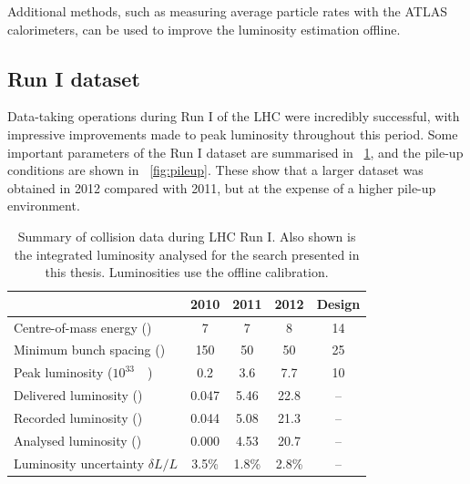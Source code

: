 Additional methods, such as measuring average particle rates with the ATLAS calorimeters, 
can be used to improve the luminosity estimation offline.



\subsection{Run I dataset}
\label{sec:dataset:dataset}

Data-taking operations during Run I of the LHC were incredibly successful, with impressive 
improvements made to peak luminosity throughout this period. Some important parameters of 
the Run I dataset are summarised in \Table~\ref{tab:dataset}, and the pile-up conditions are shown in \Figure~\ref{fig:pileup}. These show that a larger dataset was obtained in 2012 compared with 2011, but at the expense of a higher pile-up environment.

\begin{table}[h]
	\begin{tabular}{l@{\hskip 0.3in}c@{\hskip 0.3in}c@{\hskip 0.3in}c@{\hskip 0.3in}c}
	& 2010 & 2011 & 2012 & Design \\
	\hline
	Centre-of-mass energy (\TeV)         & 7 & 7 & 8 & 14 \\
	Minimum bunch spacing (\nano\second) & 150 & 50 & 50 & 25 \\
	Peak luminosity (\unit{$10^{33}$}{\lumiunits}) & 0.2 & 3.6 & 7.7 & 10 \\
	Delivered luminosity (\invfb)       & 0.047 & 5.46 & 22.8 & -- \\
	Recorded luminosity (\invfb)        & 0.044 & 5.08 & 21.3 & -- \\
	Analysed luminosity (\invfb)        & 0.000 & 4.53 & 20.7 & -- \\
	Luminosity uncertainty $\delta L/L$ & 3.5\% & 1.8\% & 2.8\% & -- \\
	\end{tabular}
	\caption{Summary of \pp collision data during \ac{LHC} Run I. Also shown is the 
	integrated luminosity analysed for the \HWW search presented in this thesis. 
	Luminosities use the offline calibration.}
	\label{tab:dataset}
\end{table}

